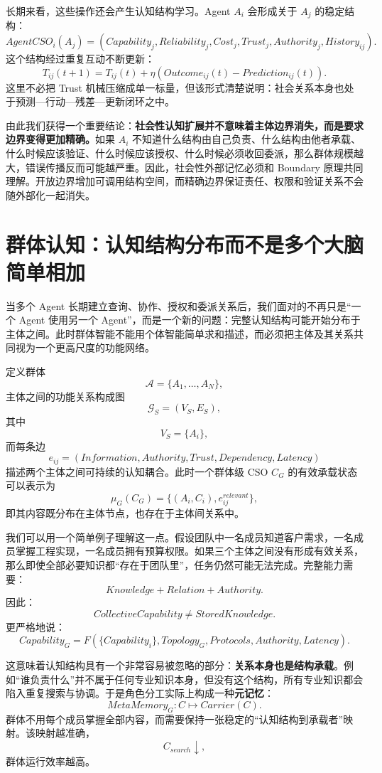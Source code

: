 长期来看，这些操作还会产生认知结构学习。Agent $A_i$ 会形成关于 $A_j$ 的稳定结构：
\[
AgentCSO_i(A_j)
=
(
Capability_j,
Reliability_j,
Cost_j,
Trust_j,
Authority_j,
History_{ij}
).
\]
这个结构经过重复互动不断更新：
\[
T_{ij}(t+1)
=
T_{ij}(t)
+
\eta
\left(
Outcome_{ij}(t)-Prediction_{ij}(t)
\right).
\]
这里不必把 Trust 机械压缩成单一标量，但该形式清楚说明：社会关系本身也处于预测—行动—残差—更新闭环之中。

由此我们获得一个重要结论：\textbf{社会性认知扩展并不意味着主体边界消失，而是要求边界变得更加精确。}如果 $A_i$ 不知道什么结构由自己负责、什么结构由他者承载、什么时候应该验证、什么时候应该授权、什么时候必须收回委派，那么群体规模越大，错误传播反而可能越严重。因此，社会性外部记忆必须和 Boundary 原理共同理解。开放边界增加可调用结构空间，而精确边界保证责任、权限和验证关系不会随外部化一起消失。

\section{群体认知：认知结构分布而不是多个大脑简单相加}

当多个 Agent 长期建立查询、协作、授权和委派关系后，我们面对的不再只是``一个 Agent 使用另一个 Agent''，而是一个新的问题：完整认知结构可能开始分布于主体之间。此时群体智能不能用个体智能简单求和描述，而必须把主体及其关系共同视为一个更高尺度的功能网络。

定义群体
\[
\mathcal A
=
\{A_1,\ldots,A_N\},
\]
主体之间的功能关系构成图
\[
\mathcal G_S
=
(V_S,E_S),
\]
其中
\[
V_S=\{A_i\},
\]
而每条边
\[
e_{ij}
=
(
Information,
Authority,
Trust,
Dependency,
Latency
)
\]
描述两个主体之间可持续的认知耦合。此时一个群体级 CSO $C_G$ 的有效承载状态可以表示为
\[
\mu_G(C_G)
=
\{
(A_i,C_i),
e_{ij}^{relevant}
\},
\]
即其内容既分布在主体节点，也存在于主体间关系中。

我们可以用一个简单例子理解这一点。假设团队中一名成员知道客户需求，一名成员掌握工程实现，一名成员拥有预算权限。如果三个主体之间没有形成有效关系，那么即使全部必要知识都``存在于团队里''，任务仍然可能无法完成。完整能力需要：
\[
Knowledge
+
Relation
+
Authority.
\]
因此：
\[
\boxed{
CollectiveCapability
\neq
StoredKnowledge.
}
\]
更严格地说：
\[
Capability_G
=
F(
\{Capability_i\},
Topology_G,
Protocols,
Authority,
Latency
).
\]

这意味着认知结构具有一个非常容易被忽略的部分：\textbf{关系本身也是结构承载}。例如``谁负责什么''并不属于任何专业知识本身，但没有这个结构，所有专业知识都会陷入重复搜索与协调。于是角色分工实际上构成一种\textbf{元记忆}：
\[
MetaMemory_G:
C
\mapsto
Carrier(C).
\]
群体不用每个成员掌握全部内容，而需要保持一张稳定的``认知结构到承载者''映射。该映射越准确，
\[
C_{search}\downarrow,
\]
群体运行效率越高。

